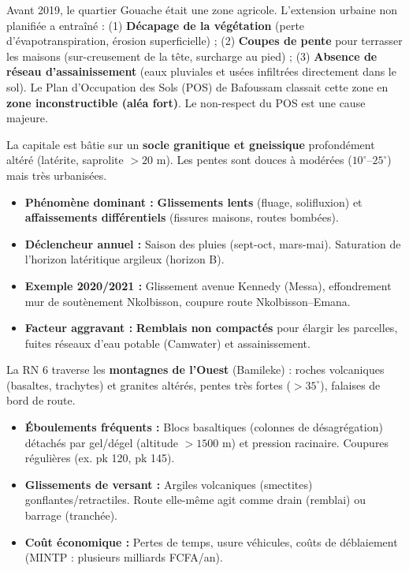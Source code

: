 \documentclass[11pt]{article}
\begin{document}
\begin{savaistu}
Avant 2019, le quartier Gouache était une zone agricole. L'extension urbaine non planifiée a entraîné : (1) \textbf{Décapage de la végétation} (perte d'évapotranspiration, érosion superficielle) ; (2) \textbf{Coupes de pente} pour terrasser les maisons (sur-creusement de la tête, surcharge au pied) ; (3) \textbf{Absence de réseau d'assainissement} (eaux pluviales et usées infiltrées directement dans le sol). Le Plan d'Occupation des Sols (POS) de Bafoussam classait cette zone en \textbf{zone inconstructible (aléa fort)}. Le non-respect du POS est une cause majeure.
\end{savaistu}

\begin{exemplebox}
La capitale est bâtie sur un \textbf{socle granitique et gneissique} profondément altéré (latérite, saprolite $> 20$ m). Les pentes sont douces à modérées ($10^\circ$--$25^\circ$) mais très urbanisées.
\begin{itemize}
    \item \textbf{Phénomène dominant :} \textbf{Glissements lents} (fluage, solifluxion) et \textbf{affaissements différentiels} (fissures maisons, routes bombées).
    \item \textbf{Déclencheur annuel :} Saison des pluies (sept-oct, mars-mai). Saturation de l'horizon latéritique argileux (horizon B).
    \item \textbf{Exemple 2020/2021 :} Glissement avenue Kennedy (Messa), effondrement mur de soutènement Nkolbisson, coupure route Nkolbisson–Emana.
    \item \textbf{Facteur aggravant :} \textbf{Remblais non compactés} pour élargir les parcelles, fuites réseaux d'eau potable (Camwater) et assainissement.
\end{itemize}
\end{exemplebox}

\begin{exemplebox}
La RN 6 traverse les \textbf{montagnes de l'Ouest} (Bamileke) : roches volcaniques (basaltes, trachytes) et granites altérés, pentes très fortes ($> 35^\circ$), falaises de bord de route.
\begin{itemize}
    \item \textbf{Éboulements fréquents :} Blocs basaltiques (colonnes de désagrégation) détachés par gel/dégel (altitude $> 1500$ m) et pression racinaire. Coupures régulières (ex. pk 120, pk 145).
    \item \textbf{Glissements de versant :} Argiles volcaniques (smectites) gonflantes/retractiles. Route elle-même agit comme drain (remblai) ou barrage (tranchée).
    \item \textbf{Coût économique :} Pertes de temps, usure véhicules, coûts de déblaiement (MINTP : plusieurs milliards FCFA/an).
\end{itemize}
\end{exemplebox}
\end{document}
